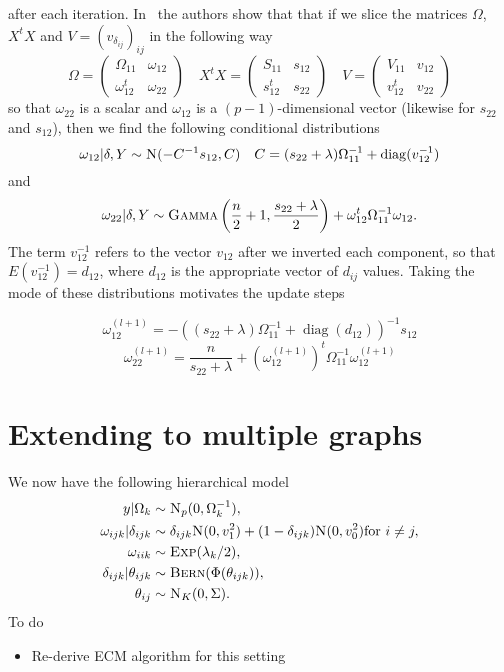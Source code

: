 \documentclass{scrartcl}
\DeclareMathOperator{\diag}{diag}
\newcommand{\Np}{\textsc{N}_p}
\newcommand{\Nor}{\textsc{N}}
\newcommand{\Bern}{\textsc{Bern}}
\newcommand{\Exp}{\textsc{Exp}}
\begin{document}
after each iteration. In~\cite{wang-2015} the authors show that that if we
slice the matrices $\Omega$, $X^t X$ and $V = (v_{\delta_{ij}})_{ij}$ in the following way
\[\Omega = \begin{pmatrix}
		\Omega_{11}   & \omega_{12} \\
		\omega_{12}^t & \omega_{22}
	\end{pmatrix}
	\quad
	X^t X = \begin{pmatrix}
		S_{11}   & s_{12} \\
		s_{12}^t & s_{22}
	\end{pmatrix}
	\quad
	V = \begin{pmatrix}
		V_{11}   & v_{12} \\
		v_{12}^t & v_{22}
	\end{pmatrix}
\]
so that $\omega_{22}$ is a scalar and $\omega_{12}$ is a $(p-1)$-dimensional vector (likewise for $s_{22}$ and $s_{12}$), then we find the following conditional distributions
\[\omega_{12} | \delta, Y \sim \Nor(-C^{-1}s_{12}, C) \quad C=(s_{22} + \lambda) \Omega_{11}^{-1} + \diag(v_{12}^{-1})\]
and
\[\omega_{22} | \delta , Y \sim \textsc{Gamma}\left(\frac{n}{2} + 1, \frac{s_{22} +
		\lambda}{2}\right) + \omega_{12}^t\Omega_{11}^{-1}\omega_{12}.\]
The term $v_{12}^{-1}$ refers to the vector $v_{12}$ after we inverted each
component, so that $E(v_{12}^{-1}) = d_{12}$, where $d_{12}$ is the appropriate
vector of $d_{ij}$ values.
Taking the mode of these distributions motivates the update steps

\[\omega_{12}^{(l+1)} = -((s_{22} + \lambda) \Omega_{11}^{-1} + \diag(d_{12}))^{-1} s_{12} \]
\[\omega_{22}^{(l+1)} = \frac{n}{s_{22} + \lambda} + (\omega_{12}^{(l+1)})^t \Omega_{11}^{-1}\omega_{12}^{(l+1)}\]

\section{Extending to multiple graphs}
We now have the following hierarchical model
\begin{align*}
	y | \Omega_k                & \sim \Np(0, \Omega_k^{-1}),                                                                \\
	\omega_{ijk} | \delta_{ijk} & \sim \delta_{ijk} \Nor(0, v_1^2) + (1 - \delta_{ijk}) \Nor(0, v_0^2) \text{for } i \neq j, \\
	\omega_{iik}                & \sim \Exp(\lambda_k/2),                                                                    \\
	\delta_{ijk} | \theta_{ijk} & \sim \Bern(\Phi(\theta_{ijk})),                                                            \\
	\theta_{ij}                 & \sim \textsc{N}_K(0, \Sigma).
\end{align*}
To do
\begin{itemize}
	\item Re-derive ECM algorithm for this setting
\end{itemize}
\end{document}
